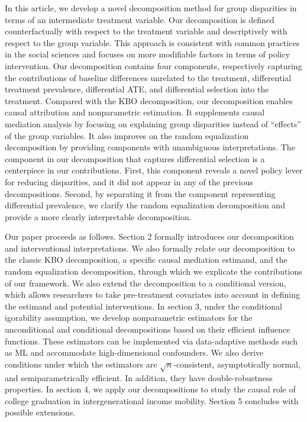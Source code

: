 \documentclass[12pt,a4paper]{article}
\begin{document}
In this article, we develop a novel decomposition method for group disparities in terms of an intermediate treatment variable. Our decomposition is defined counterfactually with respect to the treatment variable and descriptively with respect to the group variable. This approach is consistent with common practices in the social sciences and focuses on more modifiable factors in terms of policy intervention. Our decomposition contains four components, respectively capturing the contributions of baseline differences unrelated to the treatment, differential treatment prevalence, differential ATE, and differential selection into the treatment. Compared with the KBO decomposition, our decomposition enables causal attribution and nonparametric estimation. It supplements causal mediation analysis by focusing on explaining group disparities instead of ``effects'' of the group variables. It also improves on the random equalization decomposition by providing components with unambiguous interpretations. The component in our decomposition that captures differential selection is a centerpiece in our contributions. First, this component reveals a novel policy lever for reducing disparities, and it did not appear in any of the previous decompositions. Second, by separating it from the component representing differential prevalence, we clarify the random equalization decomposition and provide a more clearly interpretable decomposition. 

Our paper proceeds as follows. Section 2 formally introduces our decomposition and interventional interpretations. We also formally relate our decomposition to the classic KBO decomposition, a specific causal mediation estimand, and the random equalization decomposition, through which we explicate the contributions of our framework. We also extend the decomposition to a conditional version, which allows researchers to take pre-treatment covariates into account in defining the estimand and potential interventions. In section 3, under the conditional igorability assumption, we develop nonparametric estimators for the unconditional and conditional decompositions based on their efficient influence functions. These estimators can be implemented via data-adaptive methods such as ML and accommodate high-dimensional confounders. We also derive conditions under which the estimators are $\sqrt{n}$-consistent, asymptotically normal, and semiparametrically efficient. In addition, they have double-robustness properties. In section 4, we apply our decompositions to study the causal role of college graduation in intergenerational income mobility. Section 5 concludes with possible extensions. 
\end{document}
